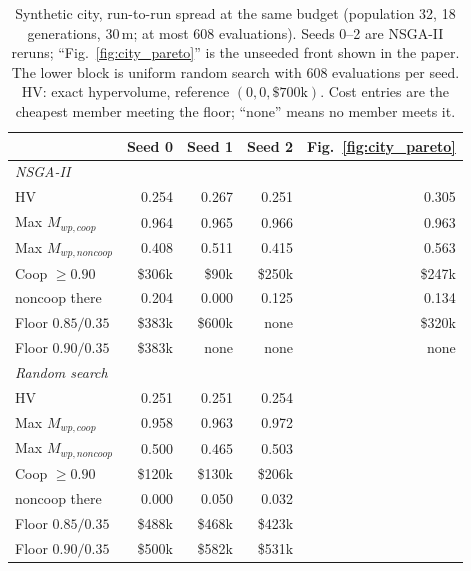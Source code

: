 \begin{table}[t]
\centering
\caption{Synthetic city, run-to-run spread at the same budget (population 32, 18 generations, 30\,m; at most 608 evaluations). Seeds 0--2 are NSGA-II reruns; ``Fig.~\ref{fig:city_pareto}'' is the unseeded front shown in the paper. The lower block is uniform random search with 608 evaluations per seed. HV: exact hypervolume, reference \((0,0,\$700\mathrm{k})\). Cost entries are the cheapest member meeting the floor; ``none'' means no member meets it.}
\label{tab:city_seeds}
\setlength{\tabcolsep}{4pt}
\begin{tabular}{lrrrr}
\toprule
 & Seed 0 & Seed 1 & Seed 2 & Fig.~\ref{fig:city_pareto} \\
\midrule
\multicolumn{5}{l}{\emph{NSGA-II}} \\
HV & 0.254 & 0.267 & 0.251 & 0.305 \\
Max \(M_{wp,coop}\) & 0.964 & 0.965 & 0.966 & 0.963 \\
Max \(M_{wp,noncoop}\) & 0.408 & 0.511 & 0.415 & 0.563 \\
Coop \(\geq0.90\) & \$306k & \$90k & \$250k & \$247k \\
\quad noncoop there & 0.204 & 0.000 & 0.125 & 0.134 \\
Floor \(0.85/0.35\) & \$383k & \$600k & none & \$320k \\
Floor \(0.90/0.35\) & \$383k & none & none & none \\
\midrule
\multicolumn{5}{l}{\emph{Random search}} \\
HV & 0.251 & 0.251 & 0.254 & \\
Max \(M_{wp,coop}\) & 0.958 & 0.963 & 0.972 & \\
Max \(M_{wp,noncoop}\) & 0.500 & 0.465 & 0.503 & \\
Coop \(\geq0.90\) & \$120k & \$130k & \$206k & \\
\quad noncoop there & 0.000 & 0.050 & 0.032 & \\
Floor \(0.85/0.35\) & \$488k & \$468k & \$423k & \\
Floor \(0.90/0.35\) & \$500k & \$582k & \$531k & \\
\bottomrule
\end{tabular}
\end{table}
